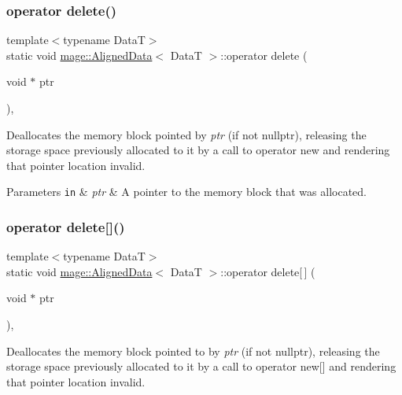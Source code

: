 \subsubsection{\texorpdfstring{operator delete()}{operator delete()}}
{\footnotesize\ttfamily template$<$typename DataT$>$ \\
static void \hyperlink{structmage_1_1_aligned_data}{mage\+::\+Aligned\+Data}$<$ DataT $>$\+::operator delete (\begin{DoxyParamCaption}\item[{void $\ast$}]{ptr }\end{DoxyParamCaption})\hspace{0.3cm}{\ttfamily [static]}, {\ttfamily [noexcept]}}

Deallocates the memory block pointed by {\itshape ptr} (if not nullptr), releasing the storage space previously allocated to it by a call to operator new and rendering that pointer location invalid.


\begin{DoxyParams}[1]{Parameters}
\mbox{\tt in}  & {\em ptr} & A pointer to the memory block that was allocated. \\
\hline
\end{DoxyParams}
\hypertarget{structmage_1_1_aligned_data_a257c2d30f4764caf48647e1f759d28b4}{}\label{structmage_1_1_aligned_data_a257c2d30f4764caf48647e1f759d28b4} 
\subsubsection{\texorpdfstring{operator delete[]()}{operator delete[]()}}
{\footnotesize\ttfamily template$<$typename DataT$>$ \\
static void \hyperlink{structmage_1_1_aligned_data}{mage\+::\+Aligned\+Data}$<$ DataT $>$\+::operator delete\mbox{[}$\,$\mbox{]} (\begin{DoxyParamCaption}\item[{void $\ast$}]{ptr }\end{DoxyParamCaption})\hspace{0.3cm}{\ttfamily [static]}, {\ttfamily [noexcept]}}

Deallocates the memory block pointed to by {\itshape ptr} (if not nullptr), releasing the storage space previously allocated to it by a call to operator new\mbox{[}\mbox{]} and rendering that pointer location invalid.


